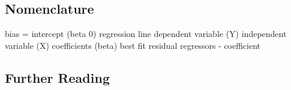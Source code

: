 \begin{bibunit}
\subsection{Nomenclature}

bias = intercept (beta 0)
regression line
dependent variable (Y)
independent variable (X)
coefficients (beta)
best fit
residual
regressors - coefficient


\subsection{Further Reading}



\putbib
\end{bibunit}

\newpage\begin{bibunit}\putbib\end{bibunit}
\newpage\begin{bibunit}\putbib\end{bibunit}
\newpage\begin{bibunit}\putbib\end{bibunit}
\newpage\begin{bibunit}\putbib\end{bibunit}
\newpage\begin{bibunit}\putbib\end{bibunit}

